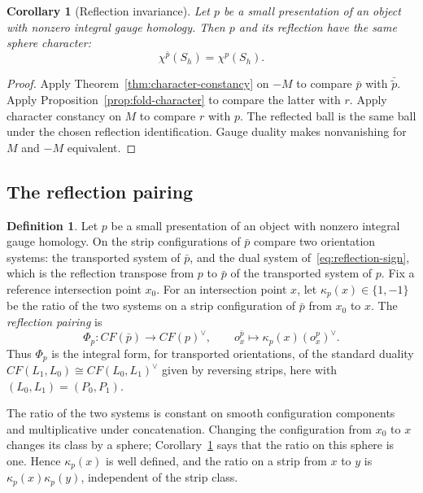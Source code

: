 \documentclass[11pt]{amsart}
\newtheorem{corollary}[theorem]{Corollary}
\theoremstyle{definition}
\newtheorem{definition}[theorem]{Definition}
\theoremstyle{remark}
\theoremstyle{plain}
\numberwithin{equation}{section}
\newcommand{\CF}{\mathit{CF}}
\begin{document}
\begin{corollary}[Reflection invariance]\label{cor:reflection-character}
Let $p$ be a small presentation of an object
with nonzero integral gauge homology. Then $p$ and
its reflection have the same sphere character:
\[
 \chi^{\bar p}(S_h)=\chi^p(S_h).
\]
\end{corollary}
\begin{proof}
Apply Theorem~\ref{thm:character-constancy}
on $-M$ to compare $\bar p$ with
$\bar{\widetilde p}$. Apply
Proposition~\ref{prop:fold-character}
to compare the latter with $r$.
Apply character constancy on $M$ to
compare $r$ with $p$. The reflected
ball is the same ball under the
chosen reflection identification.
Gauge duality makes nonvanishing
for $M$ and $-M$ equivalent.
\end{proof}

\subsection{The reflection pairing}
\begin{definition}\label{def:kappa}
Let $p$ be a small presentation of an object with nonzero
integral gauge homology. On the strip configurations of $\bar p$
compare two orientation systems: the transported system of $\bar p$,
and the dual system of~\eqref{eq:reflection-sign}, which is the
reflection transpose from $p$ to $\bar p$ of the transported system
of $p$. Fix a reference intersection point $x_0$. For an
intersection point $x$, let $\kappa_p(x)\in\{1,-1\}$ be the ratio of
the two systems on a strip configuration of $\bar p$ from $x_0$ to
$x$. The \emph{reflection pairing} is
\begin{equation}\label{eq:Phi-S}
 \Phi_p:\CF(\bar p)\longrightarrow\CF(p)^\vee,
 \qquad o_x^{\bar p}\longmapsto
                \kappa_p(x)(o_x^p)^\vee .
\end{equation}
Thus $\Phi_p$ is the integral form, for transported orientations, of
the standard duality $\CF(L_1,L_0)\cong\CF(L_0,L_1)^\vee$ given by
reversing strips, here with $(L_0,L_1)=(P_0,P_1)$.
\end{definition}

The ratio of the two systems is constant on smooth
configuration components and multiplicative under
concatenation. Changing the configuration from $x_0$
to $x$ changes its class by a sphere;
Corollary~\ref{cor:reflection-character} says that
the ratio on this sphere is one. Hence $\kappa_p(x)$
is well defined, and the ratio on a strip from $x$ to
$y$ is $\kappa_p(x)\kappa_p(y)$, independent of the
strip class.
\end{document}
